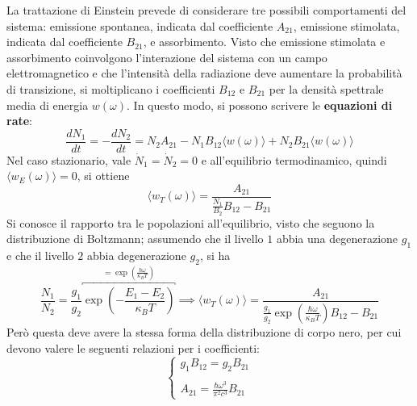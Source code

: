 \documentclass[11pt, a4paper]{scrartcl}
\theoremstyle{style}
\numberwithin{equation}{subsection}
\begin{document}
La trattazione di Einstein prevede di considerare tre possibili comportamenti del sistema: emissione spontanea, indicata dal coefficiente $A_{21}$, emissione stimolata, indicata dal coefficiente $B_{21}$, e assorbimento. 
Visto che emissione stimolata e assorbimento coinvolgono l'interazione del sistema con un campo elettromagnetico e che l'intensit\`a della radiazione deve aumentare la probabilit\`a di transizione, si moltiplicano i coefficienti $B_{12}$ e $B_{21}$ per la densit\`a spettrale media di energia $w(\omega )$.
In questo modo, si possono scrivere le \textbf{equazioni di rate}:
\begin{equation}
	\frac{d N_1}{d t}  = - \frac{d N_2}{d t}  = N_2 A_{21} - N_1 B_{12} \langle w(\omega ) \rangle + N_2 B_{21} \langle w(\omega ) \rangle
\end{equation}
Nel caso stazionario, vale $\dot{N}_1 = \dot{N}_2 = 0$ e all'equilibrio termodinamico, quindi $\langle w_E(\omega ) \rangle = 0$, si ottiene
\begin{equation}
	\langle w_T(\omega ) \rangle = \frac{A_{21}}{\frac{N_1}{B_2}B_{12} - B_{21}}
\end{equation}
Si conosce il rapporto tra le popolazioni all'equilibrio, visto che seguono la distribuzione di Boltzmann; assumendo che il livello $1$ abbia una degenerazione $g_1$ e che il livello $2$ abbia degenerazione $g_2$, si ha
\[
	\frac{N_1}{N_2} = \frac{g_1}{g_2} \overbracket{\exp \left(- \frac{E_1 - E_2}{\kappa _B T}\right) }^{= \exp \left(\frac{\hbar \omega}{\kappa _BT}\right) } \implies \langle w_T(\omega ) \rangle = \frac{A_{21}}{\displaystyle \frac{g_1}{g_2}\exp\left(\frac{\hbar \omega }{\kappa _B T}\right) B_{12}-B_21}
\] 
Per\`o questa deve avere la stessa forma della distribuzione di corpo nero, per cui devono valere le seguenti relazioni per i coefficienti:
\begin{equation}
	\begin{cases}
		g_1 B_{12} =g_2 B_{21}\\
		\\
		\displaystyle A_{21} = \frac{\hbar \omega ^3}{\pi^2 c^3}B_{21}
	\end{cases}
\end{equation}
\end{document}
